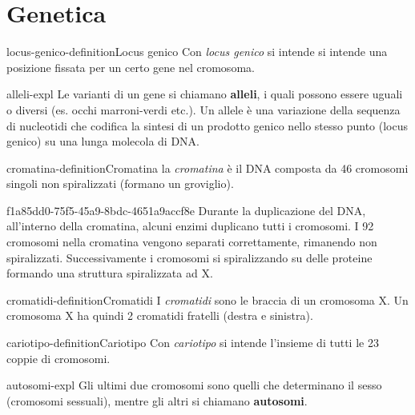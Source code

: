 \documentclass[preview]{standalone}
\begin{document}
\genpage

\section{Genetica}

\begin{snippetdefinition}{locus-genico-definition}{Locus genico}
    Con \textit{locus genico} si intende si intende una posizione fissata per
    un certo gene nel cromosoma.
\end{snippetdefinition}

\begin{snippet}{alleli-expl}
    Le varianti di un gene si chiamano \textbf{alleli}, i quali possono essere uguali o diversi
    (es. occhi marroni-verdi etc.). Un allele è una variazione della sequenza di nucleotidi che codifica la sintesi di un prodotto genico nello stesso punto (locus genico) su una lunga molecola di DNA.
\end{snippet}

\begin{snippetdefinition}{cromatina-definition}{Cromatina}
    la \textit{cromatina} è il DNA composta da 46 cromosomi singoli non spiralizzati (formano un groviglio).
\end{snippetdefinition}

\begin{snippet}{f1a85dd0-75f5-45a9-8bdc-4651a9accf8e}
    Durante la duplicazione del DNA, all'interno della cromatina,
    alcuni enzimi duplicano tutti i cromosomi.
    I 92 cromosomi nella cromatina vengono separati correttamente, rimanendo non spiralizzati.
    Successivamente i cromosomi si spiralizzando su delle proteine formando una struttura spiralizzata ad X.
\end{snippet}


\begin{snippetdefinition}{cromatidi-definition}{Cromatidi}
    I \textit{cromatidi} sono le braccia di un cromosoma X.
    Un cromosoma X ha quindi 2 cromatidi fratelli (destra e sinistra).
\end{snippetdefinition}


\begin{snippetdefinition}{cariotipo-definition}{Cariotipo}
    Con \textit{cariotipo} si intende l'insieme di tutti le 23 coppie di cromosomi.
\end{snippetdefinition}

\begin{snippet}{autosomi-expl}
    Gli ultimi due cromosomi sono quelli che determinano il sesso (cromosomi sessuali),
    mentre gli altri si chiamano \textbf{autosomi}.
\end{snippet}

\end{document}

